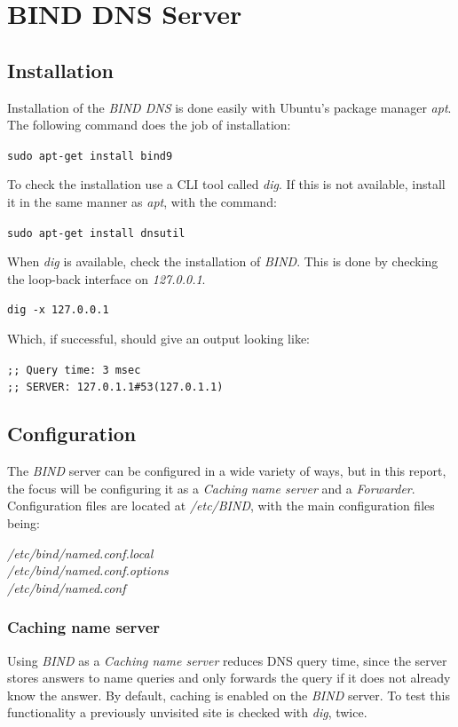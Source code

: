 \section{BIND DNS Server}
\label{sec:binddnsserver}

\subsection{Installation}
Installation of the \emph{BIND DNS} is done easily with Ubuntu's package manager \emph{apt}. The following command does the job of installation:

\texttt{sudo apt-get install bind9}

To check the installation use a CLI tool called \emph{dig}. If this is not available, install it in the same manner as \emph{apt}, with the command:

\texttt{sudo apt-get install dnsutil}

When \emph{dig} is available, check the installation of \emph{BIND}. This is done by checking the loop-back interface on \emph{127.0.0.1}.

\texttt{dig -x 127.0.0.1}

Which, if successful, should give an output looking like:

\texttt{;; Query time: 3 msec}\\
\texttt{;; SERVER: 127.0.1.1\#53(127.0.1.1)}

\subsection{Configuration}
The \emph{BIND} server can be configured in a wide variety of ways, but in this report, the focus will be configuring it as a \emph{Caching name server} and a \emph{Forwarder}. Configuration files are located at \emph{/etc/BIND}, with the main configuration files being:

\emph{/etc/bind/named.conf.local}\\
\emph{/etc/bind/named.conf.options}\\
\emph{/etc/bind/named.conf}\\

\subsubsection{Caching name server}
Using \emph{BIND} as a \emph{Caching name server} reduces DNS query time, since the server stores answers to name queries and only forwards the query if it does not already know the answer.
By default, caching is enabled on the \emph{BIND} server. To test this functionality a previously unvisited site is checked with \emph{dig}, twice.

